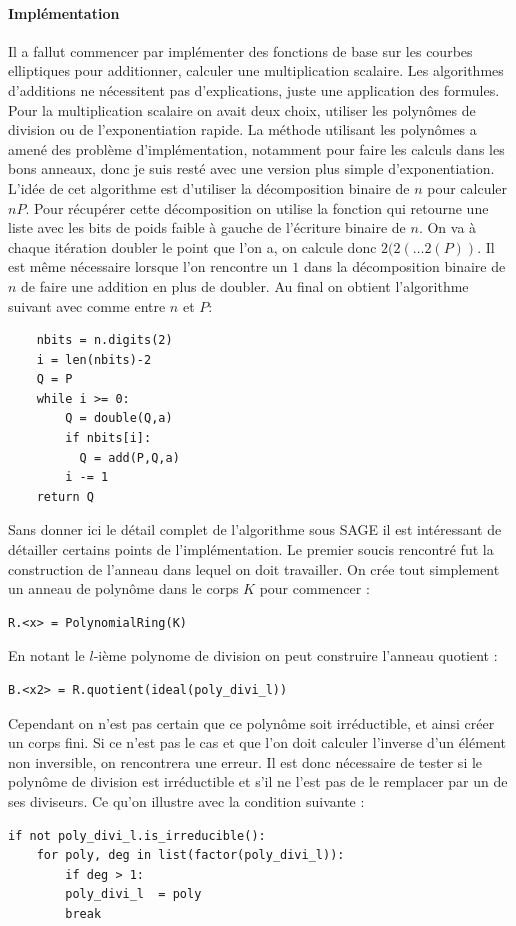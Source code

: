 \documentclass[12pt]{article}
\begin{document}
\paragraph*{Implémentation}
Il a fallut commencer par implémenter des fonctions de base sur les courbes elliptiques pour additionner, calculer une multiplication scalaire. Les algorithmes d'additions ne nécessitent pas d'explications, juste une application des formules. Pour la multiplication scalaire on avait deux choix, utiliser les polynômes de division ou de l'exponentiation rapide. La méthode utilisant les polynômes a amené des problème d'implémentation, notamment pour faire les calculs dans les bons anneaux, donc je suis resté avec une version plus simple d'exponentiation. L'idée de cet algorithme est d'utiliser la décomposition binaire de $n$ pour calculer $nP$. Pour récupérer cette décomposition on utilise la fonction  qui retourne une liste avec les bits de poids faible à gauche de l'écriture binaire de $n$. On va à chaque itération doubler le point que l'on a, on calcule donc $2(2(\ldots2(P))$. Il est même nécessaire lorsque l'on rencontre un $1$ dans la décomposition binaire de $n$ de faire une addition en plus de doubler. Au final on obtient l'algorithme suivant avec comme entre $n$ et $P$: 
\bigskip
\begin{lstlisting}
    nbits = n.digits(2)
    i = len(nbits)-2
    Q = P
    while i >= 0:
        Q = double(Q,a)
        if nbits[i]:
          Q = add(P,Q,a)
        i -= 1
    return Q
\end{lstlisting}
\bigskip

Sans donner ici le détail complet de l'algorithme sous SAGE il est intéressant de détailler certains points de l'implémentation. Le premier soucis rencontré fut la construction de l'anneau dans lequel on doit travailler. On crée tout simplement un anneau de polynôme dans le corps $K$ pour commencer :
\bigskip
\begin{lstlisting}
R.<x> = PolynomialRing(K)
\end{lstlisting}
\bigskip
En notant  le $l$-ième polynome de division on peut construire l'anneau quotient : 
\bigskip

\begin{lstlisting}
B.<x2> = R.quotient(ideal(poly_divi_l))
\end{lstlisting}
\bigskip
Cependant on n'est pas certain que ce polynôme soit irréductible, et ainsi créer un corps fini. Si ce n'est pas le cas et que l'on doit calculer l'inverse d'un élément non inversible, on rencontrera une erreur. Il est donc nécessaire de tester si le polynôme de division est irréductible et s'il ne l'est pas de le remplacer par un de ses diviseurs. Ce qu'on illustre avec la condition suivante :
\bigskip
\begin{lstlisting}
if not poly_divi_l.is_irreducible():      
	for poly, deg in list(factor(poly_divi_l)):
		if deg > 1:
		poly_divi_l  = poly
		break
\end{lstlisting}
\bigskip
\end{document}
